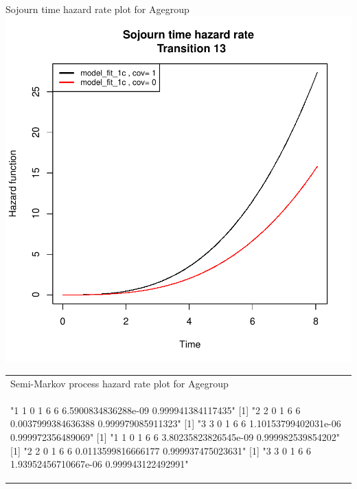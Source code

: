 \documentclass[11pt,a4paper]{article}
\begin{document}
\begin{enumerate}
\begin{minipage}{0.45\textwidth}
Sojourn time hazard rate plot for Agegroup\\
\includegraphics{SemiMarkov_Paper-017}
\end{minipage}%
\begin{minipage}{0.45\textwidth}
\begin{tabular}{|p{\textwidth}}
Semi-Markov process hazard rate plot for Agegroup\\
\begin{Schunk}
\begin{Soutput}
[1] "1 1 0 1 6 6 6.5900834836288e-09 0.999941384117435"
[1] "2 2 0 1 6 6 0.0037999384636388 0.999979085911323"
[1] "3 3 0 1 6 6 1.10153799402031e-06 0.999972356489069"
[1] "1 1 0 1 6 6 3.80235823826545e-09 0.999982539854202"
[1] "2 2 0 1 6 6 0.0113599816666177 0.999937475023631"
[1] "3 3 0 1 6 6 1.93952456710667e-06 0.999943122492991"
\end{Soutput}
\end{Schunk}

\end{tabular}
\end{minipage}
\end{enumerate}
\end{document}
